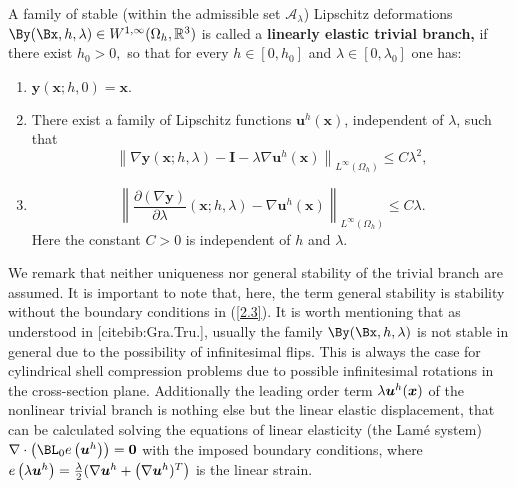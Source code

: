 \begin{definition}
\label{def:2.1}
A family of stable (within the admissible set $\mathcal{A}_\lambda$) Lipschitz deformations $\By(\Bx,h,\lambda)\in W^{1,\infty}(\Omega_h,\mathbb R^3)$ is called a \textbf{linearly elastic trivial branch,} if there exist $h_{0}>0,$ so that for every $h \in\left[0, h_{0}\right]$ and $\lambda \in\left[0, \lambda_{0}\right]$ one has:
\begin{enumerate}[label=(\roman*)]
\item $\bm y(\bm x; h,0)=\bm x.$ 
\item   There exist a family of Lipschitz functions $\boldsymbol{u}^{h}(\boldsymbol{x})$, independent of $\lambda$, such that
\begin{equation}
\label{2.4}
\left\|\nabla \boldsymbol{y}(\boldsymbol{x} ; h, \lambda)-\boldsymbol{I}-\lambda \nabla \boldsymbol{u}^{h}(\boldsymbol{x})\right\|_{L^{\infty}\left(\Omega_{h}\right)} \leq C \lambda^{2},
\end{equation}
\item 
\begin{equation}
\label{2.5}
\left\|\frac{\partial(\nabla \boldsymbol{y})}{\partial \lambda}(\boldsymbol{x} ; h, \lambda)-\nabla \boldsymbol{u}^{h}(\boldsymbol{x})\right\|_{L^{\infty}\left(\Omega_{h}\right)} \leq C \lambda.
\end{equation}
Here the constant $C>0$ is independent of $h$ and $\lambda$.
\end{enumerate}
\end{definition}
We remark that neither uniqueness nor general stability of the trivial branch are assumed. It is important to note that, here, the term general stability is stability without the boundary conditions in (\ref{2.3}). It is worth mentioning that as understood in [cite{bib:Gra.Tru.}], usually the family $\By(\Bx,h,\Gl)$ is not stable in general due to the possibility of infinitesimal flips. This is always the case for cylindrical shell compression problems due to possible infinitesimal rotations in the cross-section plane. Additionally the leading order term $\lambda\bm u^h(\bm x)$ of the nonlinear trivial branch is nothing else but the linear elastic displacement, that can be calculated solving the equations of linear elasticity (the Lam\'e system) $\nabla \cdot\left(\BL_{0} e\left(\boldsymbol{u}^{h}\right)\right)=\mathbf{0}$ with the imposed boundary conditions, where $e\left(\lambda\boldsymbol{u}^{h}\right)=\frac{\lambda}{2}(\nabla \boldsymbol{u}^{h}+\left(\nabla \boldsymbol{u}^{h})^{T}\right)$ is the linear strain. 




